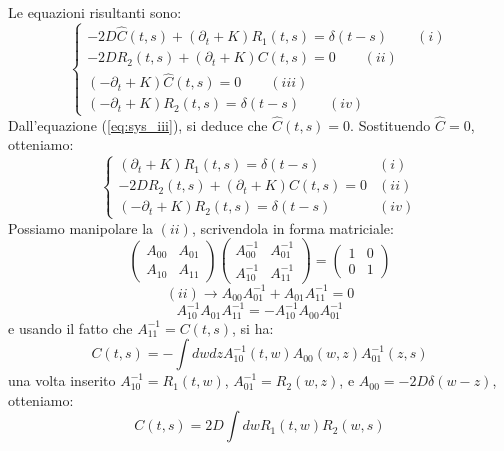 Le equazioni risultanti sono:
\begin{equation}
\begin{cases}
-2D\hat{C}(t,s)+(\partial_{t}+K)R_{1}(t,s)=\delta(t-s) \quad \quad  (i) \\
-2DR_{2}(t,s)+(\partial_{t}+K)C(t,s)=0 \quad \quad (ii)  \\
(-\partial_{t}+K)\hat{C}(t,s)=0 \quad \quad  (iii) \label{eq:sys_iii} \\
(-\partial_{t}+K)R_{2}(t,s)=\delta(t-s) \quad \quad  (iv) 
\end{cases}
\end{equation}
Dall'equazione (\ref{eq:sys_iii}), si deduce che $\hat{C}(t,s)=0$. Sostituendo $\hat{C}=0$, otteniamo:
\begin{equation*}
\begin{cases}
(\partial_{t}+K)R_{1}(t,s)=\delta(t-s) & (i) \\
-2DR_{2}(t,s)+(\partial_{t}+K)C(t,s)=0 & (ii) \\
(-\partial_{t}+K)R_{2}(t,s)=\delta(t-s) & (iv)
\end{cases}
\end{equation*}
Possiamo manipolare la $(ii)$, scrivendola in forma matriciale:
\begin{equation}
\begin{pmatrix}A_{00} & A_{01} \\ A_{10}  & A_{11}\end{pmatrix}\begin{pmatrix}A_{00}^{-1}&A_{01}^{-1}\\ A_{10}^{-1}&A_{11}^{-1}\end{pmatrix}=\begin{pmatrix}1&0\\ 0&1\end{pmatrix}
\end{equation}
\begin{equation} 
(ii) \longrightarrow A_{00}A_{01}^{-1} + A_{01}A_{11}^{-1} = 0
\end{equation}
\begin{equation}
A_{10}^{-1}A_{01}A_{11}^{-1} =- A_{10}^{-1}A_{00}A_{01}^{-1}
\end{equation}
e usando il fatto che $A_{11}^{-1} = C(t,s)$, si ha:
\begin{equation}
C(t,s) = - \int dw dz A_{10}^{-1}(t,w)A_{00}(w,z)A_{01}^{-1}(z,s)
\end{equation}
una volta inserito $A_{10}^{-1} = R_1(t,w)$, $A_{01}^{-1} = R_2(w,z)$, e $A_{00} = -2D\delta(w-z)$, otteniamo:
\begin{equation}
C(t,s) = 2D \int dw R_1(t,w)R_2(w,s) \label{eq:C_R1_R2}
\end{equation}
